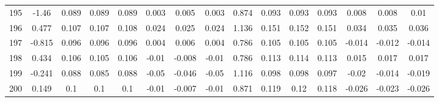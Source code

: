 \begin{table}[H]
{\begin{tabular}{l|c|ccc|ccc|c|ccc|ccc}
			195 & -1.46 & 0.089 & 0.089 & 0.089 & 0.003 & 0.005 & 0.003 & 0.874 & 0.093 & 0.093 & 0.093 & 0.008 & 0.008 & 0.01 \\
			196 & 0.477 & 0.107 & 0.107 & 0.108 & 0.024 & 0.025 & 0.024 & 1.136 & 0.151 & 0.152 & 0.151 & 0.034 & 0.035 & 0.036 \\
			197 & -0.815 & 0.096 & 0.096 & 0.096 & 0.004 & 0.006 & 0.004 & 0.786 & 0.105 & 0.105 & 0.105 & -0.014 & -0.012 & -0.014 \\
			198 & 0.434 & 0.106 & 0.105 & 0.106 & -0.01 & -0.008 & -0.01 & 0.786 & 0.113 & 0.114 & 0.113 & 0.015 & 0.017 & 0.017 \\
			199 & -0.241 & 0.088 & 0.085 & 0.088 & -0.05 & -0.046 & -0.05 & 1.116 & 0.098 & 0.098 & 0.097 & -0.02 & -0.014 & -0.019 \\
			200 & 0.149 & 0.1 & 0.1 & 0.1 & -0.01 & -0.007 & -0.01 & 0.871 & 0.119 & 0.12 & 0.118 & -0.026 & -0.023 & -0.026 \\
	\end{tabular}}
	
\end{table}
\pagebreak
